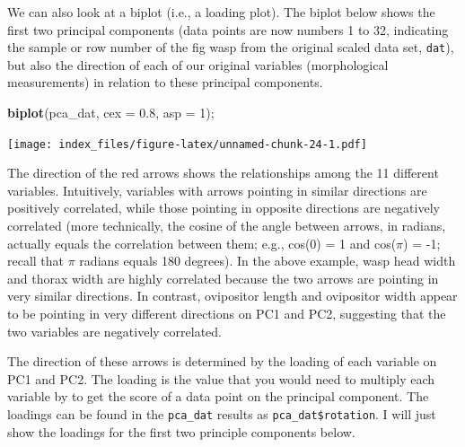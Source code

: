 \documentclass[]{article}
\newenvironment{Shaded}{\begin{snugshade}}{\end{snugshade}}
\newcommand{\CommentTok}[1]{\textcolor[rgb]{0.56,0.35,0.01}{\textit{#1}}}
\newcommand{\DataTypeTok}[1]{\textcolor[rgb]{0.13,0.29,0.53}{#1}}
\newcommand{\DecValTok}[1]{\textcolor[rgb]{0.00,0.00,0.81}{#1}}
\newcommand{\FloatTok}[1]{\textcolor[rgb]{0.00,0.00,0.81}{#1}}
\newcommand{\KeywordTok}[1]{\textcolor[rgb]{0.13,0.29,0.53}{\textbf{#1}}}
\newcommand{\NormalTok}[1]{#1}
\newcommand{\OperatorTok}[1]{\textcolor[rgb]{0.81,0.36,0.00}{\textbf{#1}}}
\begin{document}
We can also look at a biplot (i.e., a loading plot). The biplot below
shows the first two principal components (data points are now numbers 1
to 32, indicating the sample or row number of the fig wasp from the
original scaled data set, \texttt{dat}), but also the direction of each
of our original variables (morphological measurements) in relation to
these principal components.

\begin{Shaded}
\begin{Highlighting}[]
\KeywordTok{biplot}\NormalTok{(pca_dat, }\DataTypeTok{cex =} \FloatTok{0.8}\NormalTok{, }\DataTypeTok{asp =} \DecValTok{1}\NormalTok{);}
\end{Highlighting}
\end{Shaded}

\texttt{[image: index\_files/figure-latex/unnamed-chunk-24-1.pdf]}

The direction of the red arrows shows the relationships among the 11
different variables. Intuitively, variables with arrows pointing in
similar directions are positively correlated, while those pointing in
opposite directions are negatively correlated (more technically, the
cosine of the angle between arrows, in radians, actually equals the
correlation between them; e.g., cos(0) = 1 and cos(\(\pi\)) = -1; recall
that \(\pi\) radians equals 180 degrees). In the above example, wasp
head width and thorax width are highly correlated because the two arrows
are pointing in very similar directions. In contrast, ovipositor length
and ovipositor width appear to be pointing in very different directions
on PC1 and PC2, suggesting that the two variables are negatively
correlated.

The direction of these arrows is determined by the loading of each
variable on PC1 and PC2. The loading is the value that you would need to
multiply each variable by to get the score of a data point on the
principal component. The loadings can be found in the \texttt{pca\_dat}
results as \texttt{pca\_dat\$rotation}. I will just show the loadings
for the first two principle components below.

\begin{Shaded}
\end{Shaded}
\end{document}
